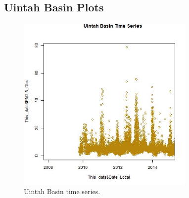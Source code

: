 
\subsection{Uintah Basin Plots}
\begin{figure} 
\centering 
\includegraphics[width=0.77\textwidth]{Code_Outputs/UintahBasin_time_series.jpg} 
\caption{\label{fig:UintahBasinTS}Uintah Basin time series.} 
\end{figure} 
 
